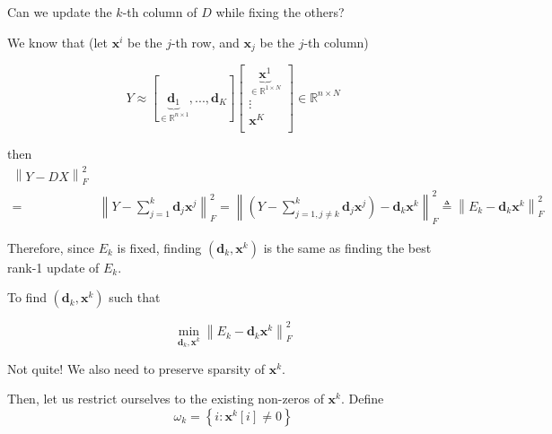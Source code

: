 \documentclass[11pt]{article}
\begin{document}
\begin{enumerate}
	Can we update the $ k $-th column of $ D $ while fixing the others?
	
	We know that (let $ \boldsymbol{x}^{i} $ be the $ j $-th row, and $ \boldsymbol{x}_{j} $ be the $ j $-th column)
	
	\begin{equation}
	Y \approx \left[ {\underbrace {{\boldsymbol{d}_1}}_{ \in {\mathbb{R}^{n \times 1}}},...,{\boldsymbol{d}_K}} \right]\left[ {\begin{matrix}
		{\underbrace {{\boldsymbol{x}^1}}_{ \in {\mathbb{R}^{1 \times N}}}}  \\ 
		\vdots   \\ 
		{{\boldsymbol{x}^K}}  \\ 
		
		\end{matrix} } \right] \in {\mathbb{R}^{n \times N}}
	\end{equation}
	
	then 
	\begin{equation}
	\begin{split}
	\left\| {Y - DX} \right\|_F^2  & \\
	= & \left\| {Y - \sum\limits_{j = 1}^k {{\boldsymbol{d}_j}{\boldsymbol{x}^j}} } \right\|_F^2 = \left\| {\left( {Y - \sum\limits_{j = 1,j \ne k}^k {{\boldsymbol{d}_j}{\boldsymbol{x}^j}} } \right) - {\boldsymbol{d}_k}{\boldsymbol{x}^k}} \right\|_F^2 \triangleq \left\| {{E_k} - {\boldsymbol{d}_k}{\boldsymbol{x}^k}} \right\|_F^2
	\end{split}
	\end{equation}
	
	Therefore, since $ E_{k} $ is fixed, finding $\left( {{\boldsymbol{d}_k},{\boldsymbol{x}^k}} \right)$ is the same as finding the best rank-1 update of $ E_{k} $.
	
	To find $\left( {{\boldsymbol{d}_k},{\boldsymbol{x}^k}} \right)$  such that
	
	\begin{equation}
	\mathop {\min }\limits_{{\boldsymbol{d}_k},{\boldsymbol{x}^k}} \left\| {{E_k} - {\boldsymbol{d}_k}{\boldsymbol{x}^k}} \right\|_F^2
	\end{equation}
	
	Not quite! We also need to preserve sparsity of $ \boldsymbol{x}^{k} $.
	
	Then, let us restrict ourselves to the existing non-zeros of $ \boldsymbol{x}^{k} $. Define 
	\begin{equation}
	{\omega _k} = \left\{ {i:{\boldsymbol{x}^k}\left[ i \right] \ne 0} \right\}
	\end{equation}
	

\end{enumerate}
\end{document}
